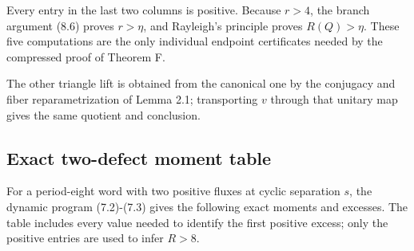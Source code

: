 Every entry in the last two columns is positive. Because \(r>4\), the branch
argument (8.6) proves \(r>\eta\), and Rayleigh's principle proves \(R(Q)>\eta\).
These five computations are the only individual endpoint certificates needed
by the compressed proof of Theorem F.

The other triangle lift is obtained from the canonical one by the conjugacy
and fiber reparametrization of Lemma 2.1; transporting \(v\) through that unitary
map gives the same quotient and conclusion.

\subsection{Exact two-defect moment table}

For a period-eight word with two positive fluxes at cyclic separation \(s\),
the dynamic program (7.2)-(7.3) gives the following exact moments and excesses.
The table includes every value needed to identify the first positive excess;
only the positive entries are used to infer \(R>8\).

\begin{center}
\end{center}

